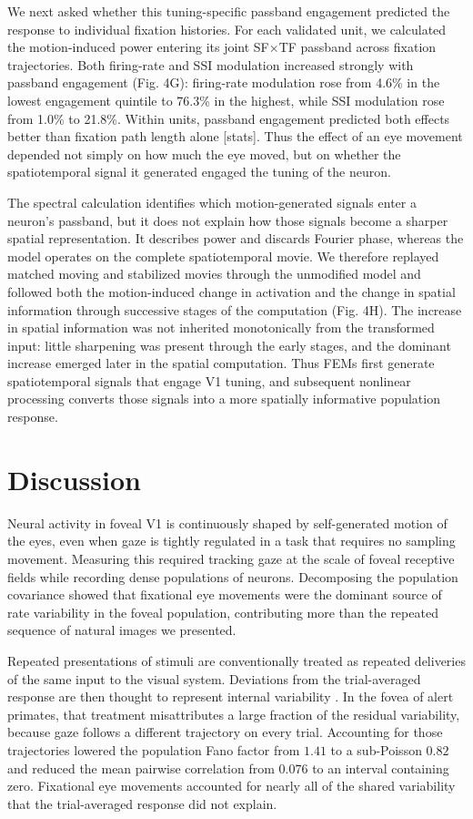 \documentclass{lite}
\begin{document}
We next asked whether this tuning-specific passband engagement predicted the response to individual fixation histories. For each validated unit, we calculated the motion-induced power entering its joint SF×TF passband across fixation trajectories. Both firing-rate and SSI modulation increased strongly with passband engagement (Fig. 4G): firing-rate modulation rose from 4.6\% in the lowest engagement quintile to 76.3\% in the highest, while SSI modulation rose from 1.0\% to 21.8\%. Within units, passband engagement predicted both effects better than fixation path length alone [stats]. Thus the effect of an eye movement depended not simply on how much the eye moved, but on whether the spatiotemporal signal it generated engaged the tuning of the neuron.

The spectral calculation identifies which motion-generated signals enter a neuron’s passband, but it does not explain how those signals become a sharper spatial representation. It describes power and discards Fourier phase, whereas the model operates on the complete spatiotemporal movie. We therefore replayed matched moving and stabilized movies through the unmodified model and followed both the motion-induced change in activation and the change in spatial information through successive stages of the computation (Fig. 4H). The increase in spatial information was not inherited monotonically from the transformed input: little sharpening was present through the early stages, and the dominant increase emerged later in the spatial computation. Thus FEMs first generate spatiotemporal signals that engage V1 tuning, and subsequent nonlinear processing converts those signals into a more spatially informative population response.

\section{Discussion}

Neural activity in foveal V1 is continuously shaped by self-generated motion of the eyes, even when gaze is tightly regulated in a task that requires no sampling movement. Measuring this required tracking gaze at the scale of foveal receptive fields \cite{yates2023detailed, wu2023high} while recording dense populations of neurons. Decomposing the population covariance showed that fixational eye movements were the dominant source of rate variability in the foveal population, contributing more than the repeated sequence of natural images we presented.

Repeated presentations of stimuli are conventionally treated as repeated deliveries of the same input to the visual system. Deviations from the trial-averaged response are then thought to represent internal variability \cite{tolhurst1983statistical, shadlen1998variable}. In the fovea of alert primates, that treatment misattributes a large fraction of the residual variability, because gaze follows a different trajectory on every trial. Accounting for those trajectories lowered the population Fano factor from $1.41$ to a sub-Poisson $0.82$ and reduced the mean pairwise correlation from $0.076$ to an interval containing zero. Fixational eye movements accounted for nearly all of the shared variability that the trial-averaged response did not explain.
\end{document}
